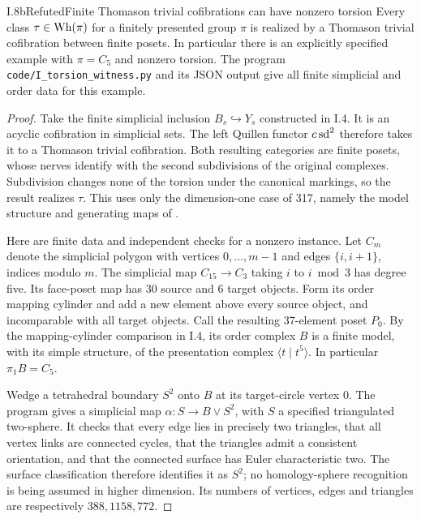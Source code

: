 \begin{claim}{I.8b}{Refuted}{Finite Thomason trivial cofibrations can have nonzero torsion}
Every class $\tau\in\operatorname{Wh}(\pi)$ for a finitely presented group $\pi$
is realized by a Thomason trivial cofibration between finite posets.
In particular there is an explicitly specified example with
$\pi=C_5$ and nonzero torsion. The program
\texttt{code/I\_torsion\_witness.py} and its JSON output give all
finite simplicial and order data for this example.
\end{claim}
\begin{proof}
Take the finite simplicial inclusion $B_s\hookrightarrow Y_s$
constructed in I.4. It is an acyclic cofibration in simplicial sets.
The left Quillen functor $c\operatorname{sd}^2$ therefore takes it to a Thomason
trivial cofibration. Both resulting categories are finite posets,
whose nerves identify with the second subdivisions of the original
complexes. Subdivision changes none of the torsion under the canonical
markings, so the result realizes $\tau$. This uses only the
dimension-one case of 317, namely the model structure and generating
maps of \cite{I_Thomason1980}.

Here are finite data and independent checks for a nonzero instance.
Let $C_m$ denote the simplicial polygon with vertices
$0,\ldots,m-1$ and edges $\{i,i+1\}$, indices modulo $m$.
The simplicial map $C_{15}\to C_3$ taking $i$ to $i\bmod3$ has
degree five. Its face-poset map has 30 source and 6 target objects.
Form its order mapping cylinder and add a new element above every
source object, and incomparable with all target objects. Call the
resulting 37-element poset $P_0$. By the mapping-cylinder comparison
in I.4, its order complex $B$ is a finite model, with its simple
structure, of the presentation complex $\langle t\mid t^5\rangle$.
In particular $\pi_1B=C_5$.

Wedge a tetrahedral boundary $S^2$ onto $B$ at its target-circle
vertex $0$. The program gives a simplicial map
$\alpha:S\to B\vee S^2$, with $S$ a specified triangulated
two-sphere. It checks that every edge lies in precisely two
triangles, that all vertex links are connected cycles, that the
triangles admit a consistent orientation, and that the connected
surface has Euler characteristic two. The surface classification
therefore identifies it as $S^2$; no homology-sphere recognition is
being assumed in higher dimension. Its numbers of vertices, edges
and triangles are respectively $388,1158,772$.


\end{proof}
